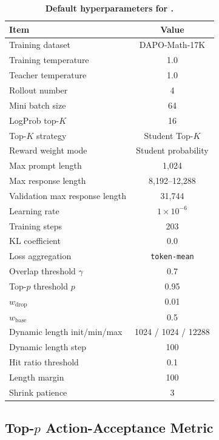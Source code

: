 \begin{table}[h]
\centering
\caption{\textbf{Default hyperparameters for \method.}}
\label{tab:hyperparams}
\small
\begin{tabular}{lc}
\toprule
\textbf{Item} & \textbf{Value} \\
\midrule
Training dataset & DAPO-Math-17K \\
Training temperature & 1.0 \\
Teacher temperature & 1.0 \\
Rollout number & 4 \\
Mini batch size & 64 \\
LogProb top-$K$ & 16 \\
Top-$K$ strategy & Student Top-$K$ \\
Reward weight mode & Student probability \\
Max prompt length & 1,024 \\
Max response length & 8,192--12,288 \\
Validation max response length & 31,744 \\
Learning rate & $1\times10^{-6}$ \\
Training steps & 203 \\
KL coefficient & 0.0 \\
Loss aggregation & \texttt{token-mean} \\
Overlap threshold $\gamma$ & 0.7 \\
Top-$p$ threshold $p$ & 0.95 \\
$w_{\mathrm{drop}}$ & 0.01 \\
$w_{\mathrm{base}}$ & 0.5 \\
Dynamic length init/min/max & 1024 / 1024 / 12288 \\
Dynamic length step & 100 \\
Hit ratio threshold & 0.1 \\
Length margin & 100 \\
Shrink patience & 3 \\
\bottomrule
\end{tabular}
\end{table}



\subsection{Top-$p$ Action-Acceptance Metric}
\label{app:top-p-metric}

